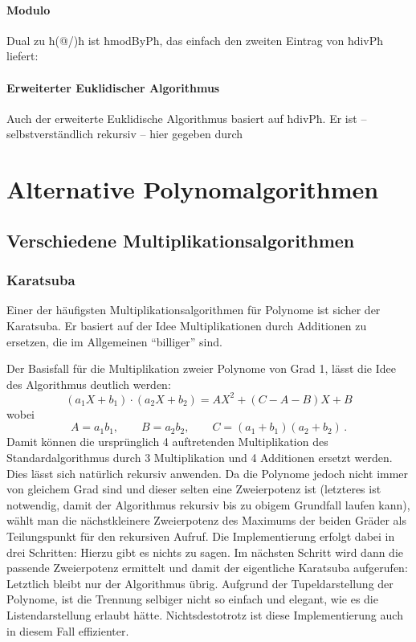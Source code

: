 

\paragraph{Modulo} Dual zu ħ(@/)ħ ist ħmodByPħ, das einfach den zweiten Eintrag
von ħdivPħ liefert:



\paragraph{Erweiterter Euklidischer Algorithmus} Auch der erweiterte
Euklidische Algorithmus basiert auf ħdivPħ. Er ist -- selbstverständlich
rekursiv -- hier gegeben durch








\section{Alternative Polynomalgorithmen}
\subsection{Verschiedene Multiplikationsalgorithmen}
\label{subsec:multAlgs}

\subsubsection{Karatsuba}
Einer der häufigsten Multiplikationsalgorithmen für Polynome ist sicher der
Karatsuba. Er basiert auf der Idee Multiplikationen durch Additionen zu
ersetzen, die im Allgemeinen "`billiger"' sind. 

Der Basisfall für die Multiplikation zweier Polynome von Grad 1, lässt die Idee
des Algorithmus deutlich werden:
\[ (a_1 X + b_1) \cdot (a_2 X + b_2) = 
  A X^2 + (C - A - B) X + B\]
wobei 
\[ A = a_1 b_1, \qquad B = a_2b_2, \qquad C = (a_1+b_1)(a_2+b_2) \,.\]
Damit können die ursprünglich 4 auftretenden Multiplikation des
Standardalgorithmus durch 3 Multiplikation und 4 Additionen ersetzt werden.
Dies lässt sich natürlich rekursiv anwenden. Da die Polynome jedoch nicht immer
von gleichem Grad sind und dieser selten eine Zweierpotenz ist (letzteres ist
notwendig, damit der Algorithmus rekursiv bis zu obigem Grundfall laufen kann),
wählt man die nächstkleinere Zweierpotenz des Maximums der beiden Gräder als
Teilungspunkt für den rekursiven Aufruf.
Die Implementierung erfolgt dabei in drei Schritten: 
Hierzu gibt es nichts zu sagen. Im nächsten Schritt wird dann die passende
Zweierpotenz ermittelt und damit der eigentliche Karatsuba aufgerufen:
Letztlich bleibt nur der Algorithmus übrig. Aufgrund der Tupeldarstellung der
Polynome, ist die Trennung selbiger nicht so einfach und elegant, wie es die
Listendarstellung erlaubt hätte. Nichtsdestotrotz ist diese Implementierung
auch in diesem Fall effizienter.

